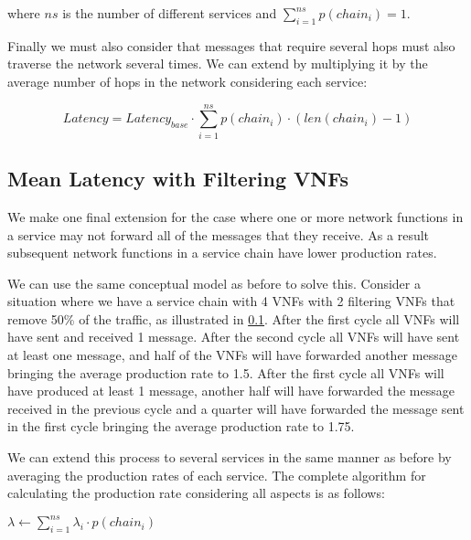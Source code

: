 where $ns$ is the number of different services and $\sum_{i=1}^{ns} p(chain_i) = 1$.

Finally we must also consider that messages that require several hops must also traverse the network several times. We can extend  by multiplying it by the average number of hops in the network considering each service:

\begin{equation}
Latency = Latency_{base} \cdot \sum_{i=1}^{ns} p(chain_i) \cdot (len(chain_i) - 1)
\end{equation}

\subsection{Mean Latency with Filtering VNFs}
We make one final extension for the case where one or more network functions in a service may not forward all of the messages that they receive. As a result subsequent network functions in a service chain have lower production rates. 

We can use the same conceptual model as before to solve this. Consider a situation where we have a service chain with 4 VNFs with 2 filtering VNFs that remove 50\% of the traffic, as illustrated in \ref{}. After the first cycle all VNFs will have sent and received 1 message. After the second cycle all VNFs will have sent at least one message, and half of the VNFs will have forwarded another message bringing the average production rate to 1.5. After the first cycle all VNFs will have produced at least 1 message, another half will have forwarded the message received in the previous cycle and a quarter will have forwarded the message sent in the first cycle bringing the average production rate to 1.75.

We can extend this process to several services in the same manner as before by averaging the production rates of each service. The complete algorithm for calculating the production rate considering all aspects is as follows:

\begin{algorithmic}[1]

\ENDFOR

\STATE $\lambda \leftarrow \sum_{i=1}^{ns} \lambda_i \cdot p(chain_i)$

\end{algorithmic}